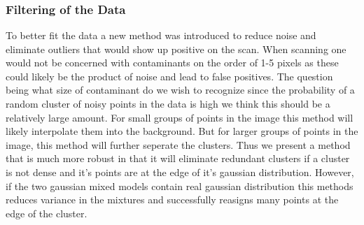 \documentclass[11pt]{article}
\begin{document}
    \begin{center}
    \end{center}
    { \hspace*{\fill} \\}
    


    \begin{center}
    \end{center}
    { \hspace*{\fill} \\}
    
    \begin{center}
    \end{center}
    { \hspace*{\fill} \\}
    
    \hypertarget{filtering-of-the-data}{%
\subsubsection{Filtering of the Data}\label{filtering-of-the-data}}

    To better fit the data a new method was introduced to reduce noise and
eliminate outliers that would show up positive on the scan. When
scanning one would not be concerned with contaminants on the order of
1-5 pixels as these could likely be the product of noise and lead to
false positives. The question being what size of contaminant do we wish
to recognize since the probability of a random cluster of noisy points
in the data is high we think this should be a relatively large amount.
For small groups of points in the image this method will likely
interpolate them into the background. But for larger groups of points in
the image, this method will further seperate the clusters. Thus we
present a method that is much more robust in that it will eliminate
redundant clusters if a cluster is not dense and it's points are at the
edge of it's gaussian distribution. However, if the two gaussian mixed
models contain real gaussian distribution this methods reduces variance
in the mixtures and successfully reasigns many points at the edge of the
cluster.
\end{document}
